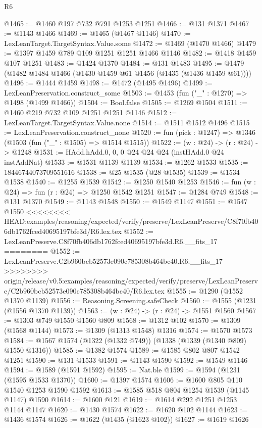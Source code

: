\begin{lexlean}{R6}
\begin{coremodule}
{{{{{{{{{{{{{{{{{{{{{{{{{{{{{{{{{{{{{{{{{{{{{{{{{{{{{{{{{{{{{@1465 := @1460 @197 @732 @791 @1253 @1251
@1466 := @131 @1371
@1467 := @1143 @1466
@1469 := @1465 (@1467 @1146)
@1470 := LexLeanTarget.TargetSyntax.Value.some
@1472 := @1469 (@1470 @1466)
@1479 := @1397 @1459 @789 @109 @1251 @1251 @1466 @1146
@1482 := @1418 @1459 @107 @1251
@1483 := @1424 @1370
@1484 := @131 @1483
@1495 := @1479 (@1482 @1484 @1466 (@1430 @1459 @61 @1456 (@1435 (@1436 @1459 @61))))
@1496 := @1444 @1459
@1498 := @1472 (@1495 @1496)
@1499 := LexLeanPreservation.construct_some
@1503 := @1453 (fun ("_" : @1270) => @1498 (@1499 @1466))
@1504 := Bool.false
@1505 := @1269 @1504
@1511 := @1460 @219 @732 @109 @1251 @1251 @1146
@1512 := LexLeanTarget.TargetSyntax.Value.none
@1514 := @1511 @1512 @1496
@1515 := LexLeanPreservation.construct_none
@1520 := fun (pick : @1247) => @1346 (@1503 (fun ("_" : @1505) => @1514 @1515))
@1522 := (w : @24) -> (r : @24) -> @1248
@1531 := HAdd.hAdd.{0, 0, 0} @24 @24 @24 (instHAdd.{0} @24 instAddNat)
@1533 := @1531 @1139 @1139
@1534 := @1262 @1533
@1535 := 18446744073709551616
@1538 := @25 @1535 (@28 @1535)
@1539 := @1534 @1538
@1540 := @1255 @1539
@1542 := @1250 @1540 @1253
@1546 := fun (w : @24) => fun (r : @24) => @1250 @1542 @1251
@1547 := @1284 @749
@1548 := @131 @1370
@1549 := @1143 @1548
@1550 := @1549 @1147
@1551 := @1547 @1550
<<<<<<<< HEAD:examples/reasoning/expected/verify/preserve/LexLeanPreserve/C8f70fb406db1762fced40695197bfe3d/R6.lex.tex
@1552 := LexLeanPreserve.C8f70fb406db1762fced40695197bfe3d.R6.__fits_17
========
@1552 := LexLeanPreserve.C2b960bcb52573e090c785308b464bc40.R6.__fits_17
>>>>>>>> origin/release/v0.5:examples/reasoning/expected/verify/preserve/LexLeanPreserve/C2b960bcb52573e090c785308b464bc40/R6.lex.tex
@1555 := @1290 (@1552 @1370 @1139)
@1556 := Reasoning.Screening.safeCheck
@1560 := @1555 (@1231 (@1556 @1370 @1139))
@1563 := (w : @24) -> (r : @24) -> @1551 @1560
@1567 := @1303 @749 @1550 @1560 @809
@1568 := @1312 @102
@1570 := @1309 (@1568 @1144)
@1573 := @1309 (@1313 @1548) @1316
@1574 := @1570 @1573
@1584 := @1567 @1574 (@1322 (@1332 @749)) (@1338 (@1339 (@1340 @809) @1550 @1316))
@1585 := @1382 @1574
@1589 := @1585 @802 @807 @1542 @1251
@1590 := @131 @1533
@1591 := @1143 @1590
@1592 := @1549 @1146
@1594 := @1589 (@1591 @1592)
@1595 := Nat.ble
@1599 := @1594 (@1231 (@1595 @1533 @1370))
@1600 := @1397 @1574
@1606 := @1600 @805 @110 @1540 @1253 @1590 @1592
@1613 := @1585 @518 @804 @1254 @1539 (@1145 @1147) @1590
@1614 := @1600 @121
@1619 := @1614 @292 @1251 @1253 @1144 @1147
@1620 := @1430 @1574
@1622 := @1620 @102 @1144
@1623 := @1436 @1574
@1626 := @1622 (@1435 (@1623 @102))
@1627 := @1619 @1626
}}}}}}}}}}}}}}}}}}}}}}}}}}}}}}}}}}}}}}}}}}}}}}}}}}}}}}}}}}}}}
\end{coremodule}
\end{lexlean}
